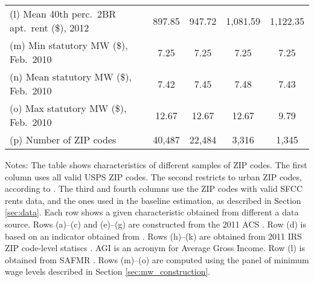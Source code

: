 \begin{landscape}
\begin{table}[hbt!]
\begin{tabular}{@{}lcccc@{}}
        (l) Mean 40th perc.\ 2BR apt.\ rent (\$), 2012   & 897.85  & 947.72  & 1,081.59  & 1,122.35      \\
        (m) Min statutory MW (\$), Feb.\ 2010            & 7.25    & 7.25    & 7.25     & 7.25           \\
        (n) Mean statutory MW (\$), Feb.\ 2010           & 7.42    & 7.45    & 7.48     & 7.43           \\
        (o) Max statutory MW (\$), Feb.\ 2010            & 12.67   & 12.67   & 12.67    & 9.79           \\
        (p) Number of ZIP codes                          & 40,487  & 22,484  & 3,316    & 1,345          \\ \bottomrule
    \end{tabular}

    \begin{minipage}{.95\linewidth} \footnotesize
        \vspace{2mm}
        Notes: The table shows characteristics of different samples of ZIP codes.
        The first column uses all valid USPS ZIP codes.
        The second restricts to urban ZIP codes, according to \textcite{MissouriCDC}.
        The third and fourth columns use the ZIP codes with valid SFCC rents 
        data, and the ones used in the baseline estimation, as described in
        Section \ref{sec:data}.
        Each row shows a given characteristic obtained from different a data 
        source.
        Rows (a)--(c) and (e)--(g) are constructed from the 2011 ACS 
        \textcite{ACS}.
        Row (d) is based on an indicator obtained from \textcite{MissouriCDC}.
        Rows (h)--(k) are obtained from 2011 IRS ZIP code-level statiscs 
        \textcite{IRS}.
        AGI is an acronym for Average Gross Income.
        Row (l) is obtained from SAFMR \textcite{hudSAFMR}.
        Rows (m)--(o) are computed using the panel of minimum wage levels 
        described in Section \ref{sec:mw_construction}.
    \end{minipage}
\end{table}
\end{landscape}
